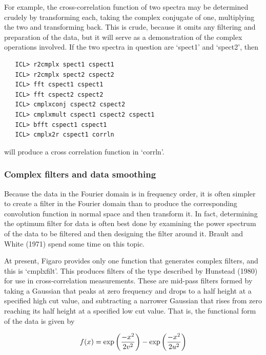 \documentclass[11pt,twoside]{article}
\begin{document}
   For example, the cross-correlation function of two spectra may be
   determined crudely by transforming each, taking the complex conjugate
   of one, multiplying the two and transforming back.  This is crude,
   because it omits any filtering and preparation of the data, but it
   will serve as a demonstration of the complex operations involved.  If
   the two spectra in question are `spect1' and `spect2', then

\begin{verbatim}
   ICL> r2cmplx spect1 cspect1
   ICL> r2cmplx spect2 cspect2
   ICL> fft cspect1 cspect1
   ICL> fft cspect2 cspect2
   ICL> cmplxconj cspect2 cspect2
   ICL> cmplxmult cspect1 cspect2 cspect1
   ICL> bfft cspect1 cspect1
   ICL> cmplx2r cspect1 corrln
\end{verbatim}

   will produce a cross correlation function in `corrln'.


\subsubsection{\label{techno6filters}Complex filters and data smoothing}

   Because the data in the Fourier domain is in frequency order, it is
   often simpler to create a filter in the Fourier domain than to
   produce the corresponding convolution function in normal space and
   then transform it.  In fact, determining the optimum filter for data
   is often best done by examining the power spectrum of the data to be
   filtered and then designing the filter around it.  Brault and White
   (1971) spend some time on this topic.

   At present, Figaro provides only one function that generates complex
   filters, and this is `cmplxfilt'.  This produces filters of the type
   described by Hunstead (1980) for use in cross-correlation
   measurements.  These are mid-pass filters formed by taking a Gaussian
   that peaks at zero frequency and drops to a half height at a
   specified high cut value, and subtracting a narrower Gaussian that
   rises from zero reaching its half height at a specified low cut
   value.  That is, the functional form of the data is given by

\begin{displaymath}
   f(x) = \exp{\left({{-x^2}\over{2 v^2}}\right)}
        - \exp{\left({{-x^2}\over{2 u^2}}\right)}
\end{displaymath}
\end{document}
